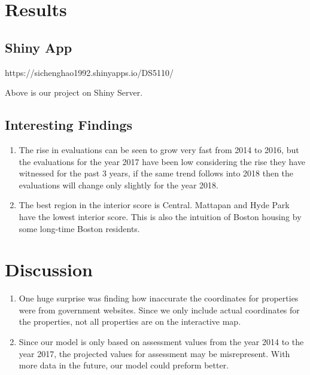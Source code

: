 \documentclass[12pt]{article}
\begin{document}
\section*{Results}

\subsection{Shiny App}

https://sichenghao1992.shinyapps.io/DS5110/

Above is our project on Shiny Server. 

\subsection{Interesting Findings}
    \begin{enumerate}
        \item The rise in evaluations can be seen to grow very fast from 
            2014 to 2016, but the evaluations for the year 2017 have been 
            low considering the rise they have witnessed for the past 3 years, 
            if the same trend follows into 2018 then the evaluations will 
            change only slightly for the year 2018.
        \item The best region in the interior score is Central. Mattapan and 
            Hyde Park have the lowest interior score. This is also the intuition 
            of Boston housing by some long-time Boston residents. 
    \end{enumerate}


\section*{Discussion}

    \begin{enumerate}
        \item One huge surprise was finding how inaccurate the coordinates for 
            properties were from government websites. Since we only include 
            actual coordinates for the properties, not all properties are on the 
            interactive map.

        \item Since our model is only based on assessment values from the year
            2014 to the year 2017, the projected values for assessment may be 
            misrepresent. With more data in the future, our model could preform 
            better.
    \end{enumerate}
\end{document}
